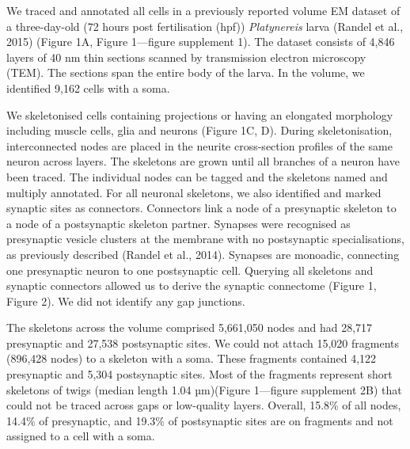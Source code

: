 \documentclass[
  11pt,
]{article}
\begin{document}
We traced and annotated all cells in a previously reported volume EM
dataset of a three-day-old (72 hours post fertilisation (hpf))
\emph{Platynereis} larva (Randel et al., 2015) (Figure 1A, Figure
1---figure supplement 1). The dataset consists of 4,846 layers of 40 nm
thin sections scanned by transmission electron microscopy (TEM). The
sections span the entire body of the larva. In the volume, we identified
9,162 cells with a soma.

We skeletonised cells containing projections or having an elongated
morphology including muscle cells, glia and neurons (Figure 1C, D).
During skeletonisation, interconnected nodes are placed in the neurite
cross-section profiles of the same neuron across layers. The skeletons
are grown until all branches of a neuron have been traced. The
individual nodes can be tagged and the skeletons named and multiply
annotated. For all neuronal skeletons, we also identified and marked
synaptic sites as connectors. Connectors link a node of a presynaptic
skeleton to a node of a postsynaptic skeleton partner. Synapses were
recognised as presynaptic vesicle clusters at the membrane with no
postsynaptic specialisations, as previously described (Randel et al.,
2014). Synapses are monoadic, connecting one presynaptic neuron to one
postsynaptic cell. Querying all skeletons and synaptic connectors
allowed us to derive the synaptic connectome (Figure 1, Figure 2). We
did not identify any gap junctions.

The skeletons across the volume comprised 5,661,050 nodes and had 28,717
presynaptic and 27,538 postsynaptic sites. We could not attach 15,020
fragments (896,428 nodes) to a skeleton with a soma. These fragments
contained 4,122 presynaptic and 5,304 postsynaptic sites. Most of the
fragments represent short skeletons of twigs (median length 1.04
µm)(Figure 1---figure supplement 2B) that could not be traced across
gaps or low-quality layers. Overall, 15.8\% of all nodes, 14.4\% of
presynaptic, and 19.3\% of postsynaptic sites are on fragments and not
assigned to a cell with a soma.
\end{document}
